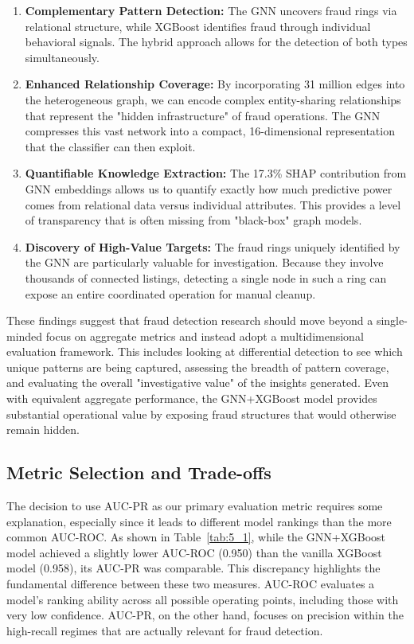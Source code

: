 \begin{enumerate}
    \item \textbf{Complementary Pattern Detection:} The GNN uncovers fraud rings via relational structure, while XGBoost identifies fraud through individual behavioral signals. The hybrid approach allows for the detection of both types simultaneously.
    
    \item \textbf{Enhanced Relationship Coverage:} By incorporating 31 million edges into the heterogeneous graph, we can encode complex entity-sharing relationships that represent the "hidden infrastructure" of fraud operations. The GNN compresses this vast network into a compact, 16-dimensional representation that the classifier can then exploit.
    
    \item \textbf{Quantifiable Knowledge Extraction:} The 17.3\% SHAP contribution from GNN embeddings allows us to quantify exactly how much predictive power comes from relational data versus individual attributes. This provides a level of transparency that is often missing from "black-box" graph models.
    
    \item \textbf{Discovery of High-Value Targets:} The fraud rings uniquely identified by the GNN are particularly valuable for investigation. Because they involve thousands of connected listings, detecting a single node in such a ring can expose an entire coordinated operation for manual cleanup.
\end{enumerate}

These findings suggest that fraud detection research should move beyond a single-minded focus on aggregate metrics and instead adopt a multidimensional evaluation framework. This includes looking at differential detection to see which unique patterns are being captured, assessing the breadth of pattern coverage, and evaluating the overall "investigative value" of the insights generated. Even with equivalent aggregate performance, the GNN+XGBoost model provides substantial operational value by exposing fraud structures that would otherwise remain hidden.

\subsection{Metric Selection and Trade-offs}
\label{sec:5_10_1b}

The decision to use AUC-PR as our primary evaluation metric requires some explanation, especially since it leads to different model rankings than the more common AUC-ROC. As shown in Table~\ref{tab:5_1}, while the GNN+XGBoost model achieved a slightly lower AUC-ROC (0.950) than the vanilla XGBoost model (0.958), its AUC-PR was comparable. This discrepancy highlights the fundamental difference between these two measures. AUC-ROC evaluates a model's ranking ability across all possible operating points, including those with very low confidence. AUC-PR, on the other hand, focuses on precision within the high-recall regimes that are actually relevant for fraud detection.


